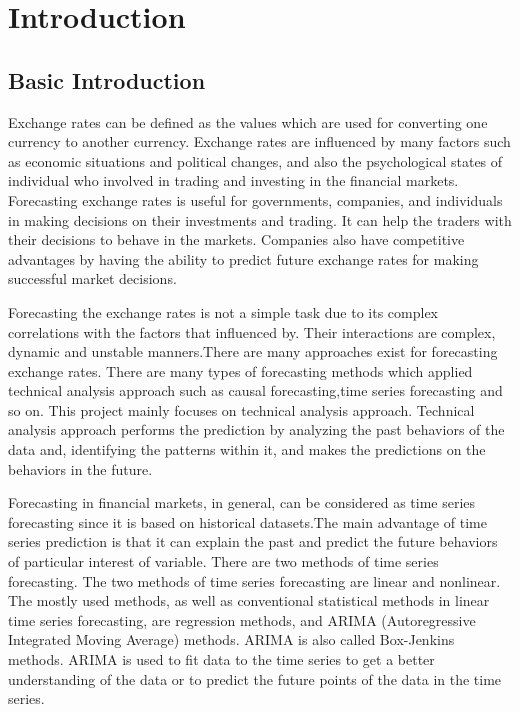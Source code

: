 \chapter{Introduction}
\section{Basic Introduction}
Exchange rates can be defined as the values which are used for  converting one currency to another currency. Exchange rates are influenced by many factors such as economic situations and political changes, and also the psychological states of individual  who involved in trading and investing in the financial markets. Forecasting exchange rates is useful for governments, companies, and individuals in making decisions on their investments and trading. It can help the traders with their decisions to behave in the markets. Companies also have competitive advantages by having  the ability to predict  future exchange rates for  making  successful market decisions.

Forecasting the exchange rates is not a simple task due to its complex correlations with the factors that influenced by. Their interactions are complex, dynamic and  unstable  manners.There are many approaches exist for forecasting exchange rates. There are many types of forecasting methods which applied technical analysis approach  such as causal forecasting,time series forecasting and so on. This project mainly focuses on technical  analysis approach. Technical analysis approach performs the prediction by analyzing the past behaviors of the data and, identifying the patterns within it, and makes the predictions on the  behaviors  in the future. 

 Forecasting in financial markets, in general, can be considered as time series forecasting since it is based on historical datasets.The main advantage of time series prediction is that it can explain  the past and predict the future behaviors of particular interest  of variable. There are two methods of time series forecasting. The two methods of time series forecasting are linear and nonlinear. The  mostly used methods, as well as conventional  statistical methods  in linear time series forecasting, are regression methods, and  ARIMA (Autoregressive Integrated Moving Average) methods. ARIMA is also called Box-Jenkins methods. ARIMA is used to fit data to the time series to get a better understanding of the data or to predict the future points of the data in the time series.

